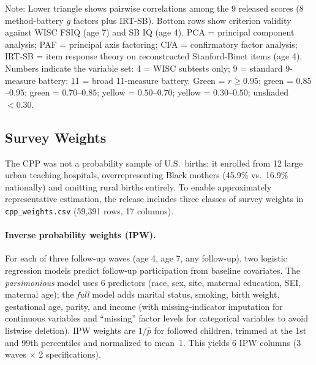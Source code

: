 \documentclass[12pt]{article}
\begin{document}
\begin{table}[H]
\begin{tabular}{lrrrrrrrrr}
\bottomrule
\end{tabular}
\par\vspace{4pt}
{\footnotesize Note: Lower triangle shows pairwise correlations among the 9 released scores (8 method-battery $g$ factors plus IRT-SB). Bottom rows show criterion validity against WISC FSIQ (age 7) and SB IQ (age 4). PCA = principal component analysis; PAF = principal axis factoring; CFA = confirmatory factor analysis; IRT-SB = item response theory on reconstructed Stanford-Binet items (age 4). Numbers indicate the variable set: 4 = WISC subtests only; 9 = standard 9-measure battery; 11 = broad 11-measure battery. \colorbox{green!40}{Green} = $r \geq 0.95$; \colorbox{green!30}{green} = $0.85$--$0.95$; \colorbox{green!20}{green} = $0.70$--$0.85$; \colorbox{yellow!30}{yellow} = $0.50$--$0.70$; \colorbox{yellow!15}{yellow} = $0.30$--$0.50$; unshaded $< 0.30$.}
\end{table}

\subsection{Survey Weights}
\label{sec:weights}

The CPP was not a probability sample of U.S.\ births: it enrolled from 12 large urban teaching hospitals, overrepresenting Black mothers (45.9\% vs.\ 16.9\% nationally) and omitting rural births entirely. To enable approximately representative estimation, the release includes three classes of survey weights in \texttt{cpp\_weights.csv} (59,391 rows, 17 columns).

\paragraph{Inverse probability weights (IPW).} For each of three follow-up waves (age 4, age 7, any follow-up), two logistic regression models predict follow-up participation from baseline covariates. The \textit{parsimonious} model uses 6 predictors (race, sex, site, maternal education, SEI, maternal age); the \textit{full} model adds marital status, smoking, birth weight, gestational age, parity, and income (with missing-indicator imputation for continuous variables and ``missing'' factor levels for categorical variables to avoid listwise deletion). IPW weights are $1/\hat{p}$ for followed children, trimmed at the 1st and 99th percentiles and normalized to mean~1. This yields 6 IPW columns (3 waves $\times$ 2 specifications).
\end{document}
